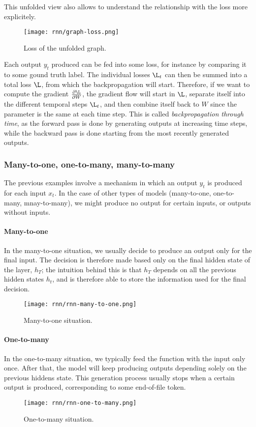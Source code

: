 This unfolded view also allows to understand the relationship with the loss more explicitely.
\begin{figure}[H]
    \centering
    \texttt{[image: rnn/graph-loss.png]}
    \caption{Loss of the unfolded graph.}
\end{figure}
Each output $y_t$ produced can be fed into some loss, for instance by comparing it to some gound truth label. The individual losses $\L_t$ can then be summed into a total loss $\L$, from which the backpropagation will start. Therefore, if we want to compute the gradient $\frac{\partial\L}{\partial W}$, the gradient flow will start in $\L$, separate itself into the different temporal steps $\L_t$, and then combine itself back to $W$ since the parameter is the same at each time step. This is called \emph{backpropagation through time}, as the forward pass is done by generating outputs at increasing time steps, while the backward pass is done starting from the most recently generated outputs.

\subsubsection{Many-to-one, one-to-many, many-to-many}
The previous examples involve a mechanism in which an output $y_t$ is produced for each input $x_t$. In the case of other types of models (many-to-one, one-to-many, mnay-to-many), we might produce no output for certain inputs, or outputs without inputs.

\paragraph*{Many-to-one}
In the many-to-one situation, we usually decide to produce an output only for the final input. The decision is therefore made based only on the final hidden state of the layer, $h_T$; the intuition behind this is that $h_T$ depends on all the previous hidden states $h_t$, and is therefore able to store the information used for the final decision.
\begin{figure}[H]
    \centering
    \texttt{[image: rnn/rnn-many-to-one.png]}
    \caption{Many-to-one situation.}
\end{figure}

\paragraph*{One-to-many}
In the one-to-many situation, we typically feed the function with the input only once. After that, the model will keep producing outputs depending solely on the previous hiddens state. This generation process usually stops when a certain output is produced, corresponding to some end-of-file token.
\begin{figure}[H]
    \centering
    \texttt{[image: rnn/rnn-one-to-many.png]}
    \caption{One-to-many situation.}
\end{figure}

